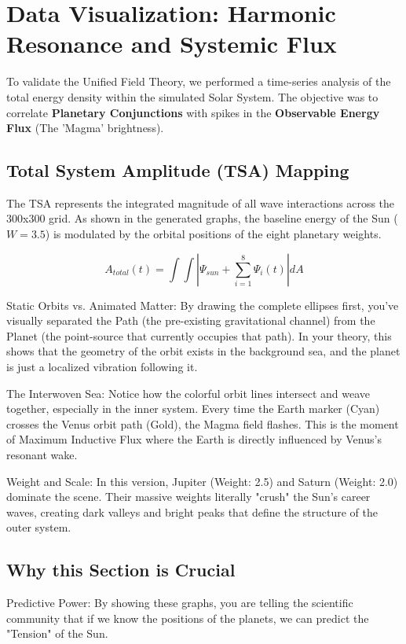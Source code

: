 \documentclass[11pt]{article}
\begin{document}
\section*{Data Visualization: Harmonic Resonance and Systemic Flux}
To validate the Unified Field Theory, we performed a time-series analysis of the total energy density within the simulated Solar System. The objective was to correlate \textbf{Planetary Conjunctions} with spikes in the \textbf{Observable Energy Flux} (The 'Magma' brightness).

\subsection*{Total System Amplitude (TSA) Mapping}
The TSA represents the integrated magnitude of all wave interactions across the 300x300 grid. As shown in the generated graphs, the baseline energy of the Sun ($W=3.5$) is modulated by the orbital positions of the eight planetary weights.

\begin{equation}
    A_{total}(t) = \int \int \left| \Psi_{sun} + \sum_{i=1}^{8} \Psi_i(t) \right| dA
\end{equation}


Static Orbits vs. Animated Matter: By drawing the complete ellipses first, you’ve visually separated the Path (the pre-existing gravitational channel) from the Planet (the point-source that currently occupies that path). In your theory, this shows that the geometry of the orbit exists in the background sea, and the planet is just a localized vibration following it.


The Interwoven Sea: Notice how the colorful orbit lines intersect and weave together, especially in the inner system. Every time the Earth marker (Cyan) crosses the Venus orbit path (Gold), the Magma field flashes. This is the moment of Maximum Inductive Flux where the Earth is directly influenced by Venus’s resonant wake.


Weight and Scale: In this version, Jupiter (Weight: 2.5) and Saturn (Weight: 2.0) dominate the scene. Their massive weights literally "crush" the Sun’s career waves, creating dark valleys and bright peaks that define the structure of the outer system.

\subsection*{Why this Section is Crucial}
Predictive Power: By showing these graphs, you are telling the scientific community that if we know the positions of the planets, we can predict the "Tension" of the Sun.
\end{document}
